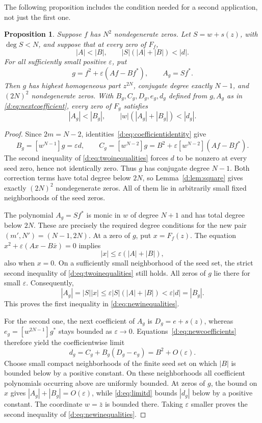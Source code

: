 \documentclass[UTF8,11pt]{ctexart}
\newtheorem{prop}[thm]{Proposition}
\theoremstyle{definition}
\numberwithin{equation}{section}
\newcommand{\eps}{\varepsilon}\newcommand{\ep}{\varepsilon}
\begin{document}
The following proposition includes the condition needed for a second
application, not just the first one.
\begin{prop}\label{d:prop:iterate}
Suppose $f$ has $N^2$ nondegenerate zeros. Let $S=w+s(z)$, with
$\deg S<N$, and suppose that at every zero of $F_f$,
\begin{equation}\label{d:eq:twoinequalities}
 |A|<|B|,\qquad |S|(|A|+|B|)<|d|.
\end{equation}
For all sufficiently small positive $\eps$, put
\[
 g=f^2+\eps(Af-Bf^*),\qquad A_g=Sf^*.
\]
Then $g$ has highest homogeneous part $z^{2N}$, conjugate degree exactly
$N-1$, and $(2N)^2$ nondegenerate zeros. With $B_g,C_g,D_g,e_g,d_g$
defined from $g,A_g$ as in \eqref{d:eq:nextcoefficient}, every zero of $F_g$
satisfies
\begin{equation}\label{d:eq:newinequalities}
 |A_g|<|B_g|,\qquad |w|(|A_g|+|B_g|)<|d_g|.
\end{equation}
\end{prop}
\begin{proof}
Since $2m=N-2$, identities~\eqref{d:eq:coefficientidentity} give
\begin{equation}\label{d:eq:newcoefficients}
 B_g=[w^{N-1}]g=\eps d,\qquad
 C_g=[w^{N-2}]g=B^2+\eps[w^{N-2}](Af-Bf^*).
\end{equation}
The second inequality of \eqref{d:eq:twoinequalities} forces $d$ to be
nonzero at every seed zero, hence not identically zero. Thus $g$ has
conjugate degree $N-1$. Both correction terms have total degree below
$2N$, so Lemma~\ref{d:lem:square} gives exactly $(2N)^2$ nondegenerate
zeros. All of them lie in arbitrarily small fixed neighborhoods of the
seed zeros.

The polynomial $A_g=Sf^*$ is monic in $w$ of degree $N+1$ and has total
degree below $2N$. These are precisely the required degree conditions
for the new pair $(m',N')=(N-1,2N)$.
At a zero of $g$, put $x=F_f(z)$. The equation
$x^2+\eps(Ax-B\bar x)=0$ implies
\[
 |x|\le\eps(|A|+|B|),
\]
also when $x=0$. On a sufficiently small neighborhood of the seed set,
the strict second inequality of \eqref{d:eq:twoinequalities} still holds.
All zeros of $g$ lie there for small $\eps$. Consequently,
\[
 |A_g|=|S||x|\le\eps|S|(|A|+|B|)<\eps|d|=|B_g|.
\]
This proves the first inequality in \eqref{d:eq:newinequalities}.

For the second one, the next coefficient of $A_g$ is
$D_g=e+s(z)$, whereas $e_g=[w^{2N-1}]g^*$ stays bounded as
$\eps\to0$. Equations~\eqref{d:eq:newcoefficients} therefore yield the
coefficientwise limit
\begin{equation}\label{d:eq:limitd}
 d_g=C_g+B_g(D_g-e_g)=B^2+O(\eps).
\end{equation}
Choose small compact neighborhoods of the finite seed set on which
$|B|$ is bounded below by a positive constant. On these neighborhoods
all coefficient polynomials occurring above are uniformly bounded.
At zeros of $g$, the bound on $x$ gives
$|A_g|+|B_g|=O(\eps)$, while \eqref{d:eq:limitd} bounds $|d_g|$ below by
a positive constant. The coordinate $w=\bar z$ is bounded there.
Taking $\eps$ smaller proves the second inequality of
\eqref{d:eq:newinequalities}.
\end{proof}
\end{document}
